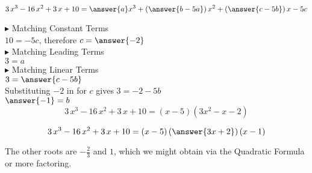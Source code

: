 \documentclass{ximera}
\begin{document}
\begin{example}
\[
3\, x^3 - 16 \, x^2 + 3 \, x + 10 = \answer{a} x^3 + \left( \answer{b-5a} \right) x^2 + \left( \answer{c-5b} \right) x - 5c
\]



$\blacktriangleright$ Matching Constant Terms \\


$10 = -5c$, therefore $c = \answer{-2}$ \\



$\blacktriangleright$ Matching Leading Terms \\


$3 = a$ \\



$\blacktriangleright$ Matching Linear Terms \\

$3 = \answer{c-5b}$ \\

Substituting $-2$ in for $c$ gives $3 = -2 - 5b$ \\

$\answer{-1} = b$ \\






\[
3\, x^3 - 16 \, x^2 + 3 \, x + 10  = (x - 5) (3 x^2 -  x - 2) 
\]




\[
3\, x^3 - 16 \, x^2 + 3 \, x + 10  = (x - 5) \left(\answer{3x + 2} \right) (x - 1) 
\]


The other roots are $-\frac{2}{3}$ and $1$, which we might obtain via the Quadratic Formula or more factoring.








\end{example}
\end{document}
